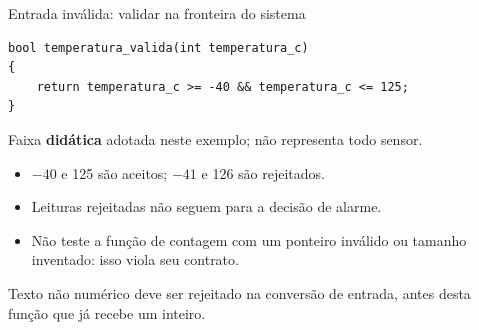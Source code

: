\begin{frame}[fragile]{Entrada inválida: validar na fronteira do sistema}
\begin{lstlisting}
bool temperatura_valida(int temperatura_c)
{
    return temperatura_c >= -40 && temperatura_c <= 125;
}
\end{lstlisting}
\small Faixa \textbf{didática} adotada neste exemplo; não representa todo sensor.
\begin{itemize}
\item $-40$ e 125 são aceitos; $-41$ e 126 são rejeitados.
\item Leituras rejeitadas não seguem para a decisão de alarme.
\item Não teste a função de contagem com um ponteiro inválido ou tamanho inventado: isso viola seu contrato.
\end{itemize}
\small Texto não numérico deve ser rejeitado na conversão de entrada, antes desta função que já recebe um inteiro.
\end{frame}
